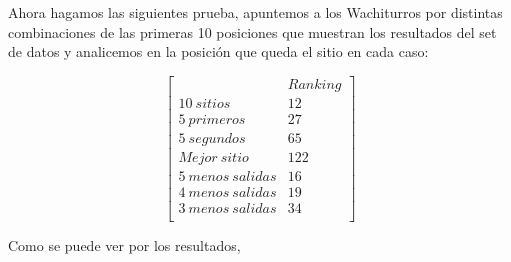 Ahora hagamos las siguientes prueba, apuntemos a los Wachiturros por distintas combinaciones de las primeras 10 posiciones que muestran los resultados del set de datos y analicemos en la posición que queda el sitio en cada caso:

   $$ 
\begin{bmatrix}
              		&      Ranking \\
 10\ sitios 		&   	12         \\
 5\ primeros   		&     	27   \\
 5\ segundos   		&      	65 	\\
 Mejor\ sitio   		&        122    \\
 5\ menos\ salidas  	&        16     \\
 4\ menos\ salidas  	&        19  \\
 3\ menos\ salidas   	&     	34 \\
\end{bmatrix} 
$$

Como se puede ver por los resultados, 




